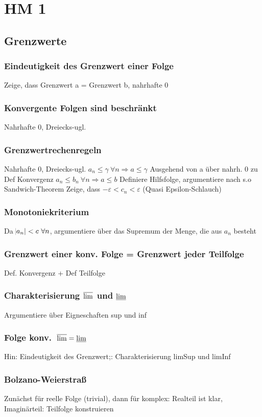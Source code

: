 \chapter{HM 1}
\section{Grenzwerte}
\subsection{Eindeutigkeit des Grenzwert einer Folge }
 Zeige, dass Grenzwert a = Grenzwert b, nahrhafte 0
\subsection{Konvergente Folgen sind beschränkt }
 Nahrhafte 0, Dreiecks-ugl.
\subsection{Grenzwertrechenregeln }
 Nahrhafte 0, Dreiecks-ugl.
$a_n \leq \gamma\ \forall n \Rightarrow a \leq \gamma$
 Ausgehend von a über nahrh. 0 zu Def Konvergenz
$a_n \leq b_n\ \forall n \Rightarrow a\leq b$
 Definiere Hilfsfolge, argumentiere nach s.o
Sandwich-Theorem
 Zeige, dass $-\varepsilon < c_n < \varepsilon$  (Quasi Epsilon-Schlauch)
\subsection{Monotoniekriterium }
 Da $\abs{a_n} < c\ \forall n$, argumentiere über das Supremum der Menge, die aus $a_n$ besteht
\subsection{Grenzwert einer konv. Folge = Grenzwert jeder Teilfolge }
 Def. Konvergenz + Def Teilfolge
\subsection{Charakterisierung $\varlimsup$ und $\varliminf$ }
 Argumentiere über Eigneschaften sup und inf
\subsection{Folge konv.\ $\varlimsup = \varliminf$ }
 Hin: Eindeutigkeit des Grenzwert;: Charakterisierung limSup und limInf
\subsection{Bolzano-Weierstraß }
 Zunächst für reelle Folge (trivial), dann für komplex: Realteil ist klar, Imaginärteil: Teilfolge konstruieren
